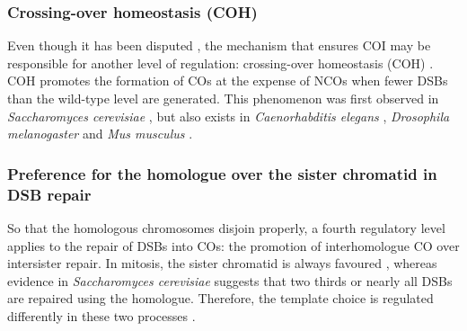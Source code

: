 


\subsubsection{Crossing-over homeostasis (COH)}
Even though it has been disputed \citep{shinohara2008crossover}, the mechanism that ensures COI may be responsible for another level of regulation: crossing-over homeostasis (COH) \citep[reviewed in \citealp{youds2011choice}]{joshi2009pch2,zanders2009pch2delta}.
COH promotes the formation of COs at the expense of NCOs when fewer DSBs than the wild-type level are generated.
This phenomenon was first observed in \textit{Saccharomyces cerevisiae} \citep{martini2006crossover,chen2008global}, but also exists in \textit{Caenorhabditis elegans} \citep{yokoo2012cosa1,globus2012joy}, \textit{Drosophila melanogaster} \citep{mehrotra2006temporal} and \textit{Mus musculus} \citep{cole2012homeostatic}.




\subsubsection{Preference for the homologue over the sister chromatid in DSB repair}

So that the homologous chromosomes disjoin properly, a fourth regulatory level applies to the repair of DSBs into COs: the promotion of interhomologue CO over intersister repair.
In mitosis, the sister chromatid is always favoured \citep{kadyk1992sister,bzymek2010double}, whereas evidence in \textit{Saccharomyces cerevisiae} suggests that two thirds \citep{goldfarb2010frequent} or nearly all \citep{pan2011hierarchical} DSBs are repaired using the homologue.
Therefore, the template choice is regulated differently in these two processes \citep{andersen2010meiotic}.

